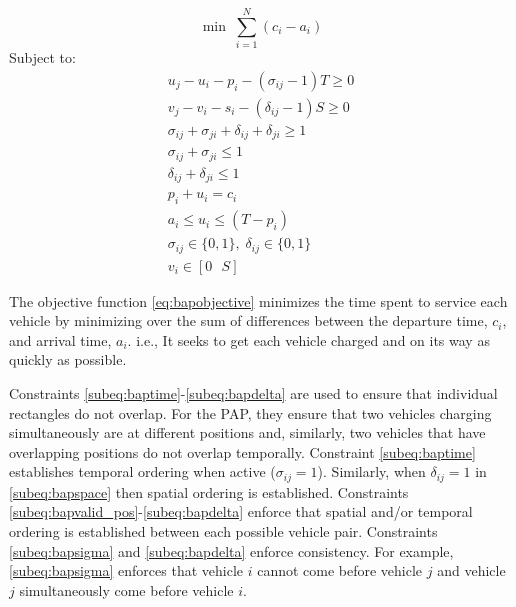 \documentclass[utf8]{FrontiersinHarvard}
\begin{document}
\begin{equation}
	\label{eq:bapobjective}
	\min\; \sum_{i=1}^N (c_i - a_i)
\end{equation}
Subject to:
\begin{subequations}
\label{eq:bapconstrs}
\begin{align}
    u_j - u_i - p_i - (\sigma_{ij} - 1)T \geq 0                  \label{subeq:baptime}          \\
    v_j - v_i - s_i - (\delta_{ij} - 1)S \geq 0                \label{subeq:bapspace}         \\
    \sigma_{ij} + \sigma_{ji} + \delta_{ij} + \delta_{ji} \geq 1 \label{subeq:bapvalid_pos}     \\
    \sigma_{ij} + \sigma_{ji} \leq 1                              \label{subeq:bapsigma}        \\
    \delta_{ij} + \delta_{ji} \leq 1                              \label{subeq:bapdelta}        \\
    p_i + u_i = c_i                                               \label{subeq:bapdetach}       \\
    a_i \leq u_i \leq (T - p_i)                                   \label{subeq:bapvalid_starts} \\
    \sigma_{ij} \in \{0,1\},\;\delta_{ij} \in \{0,1\}\;           \label{subeq:bapsdspace}      \\
    v_i \in [0 \mbox{ } S ]                                       \label{subeq:bapvspace}
\end{align}
\end{subequations}

\noindent

The objective function \eqref{eq:bapobjective} minimizes the time spent to service each vehicle by minimizing over the
sum of differences between the departure time, $c_i$, and arrival time, $a_i$. i.e., It seeks to get each vehicle
charged and on its way as quickly as possible.

Constraints \ref{subeq:baptime}-\ref{subeq:bapdelta} are used to ensure that individual rectangles do not overlap. For
the PAP, they ensure that two vehicles charging simultaneously are at different positions and, similarly, two vehicles
that have overlapping positions do not overlap temporally. Constraint \eqref{subeq:baptime} establishes temporal
ordering when active ($\sigma_{ij}=1$). Similarly, when $\delta_{ij} =1$ in \eqref{subeq:bapspace} then spatial ordering is
established. Constraints \ref{subeq:bapvalid_pos}-\ref{subeq:bapdelta} enforce that spatial and/or temporal ordering is
established between each possible vehicle pair. Constraints \eqref{subeq:bapsigma} and \eqref{subeq:bapdelta} enforce
consistency. For example, \eqref{subeq:bapsigma} enforces that vehicle $i$ cannot come before vehicle $j$ and vehicle
$j$ simultaneously come before vehicle $i$.
\end{document}
